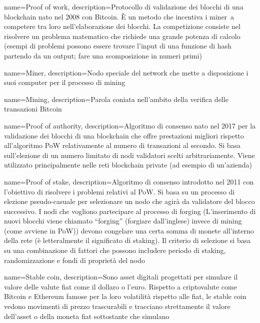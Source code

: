 {
	name={Proof of work},
	description={Protocollo di validazione dei blocchi di una blockchain nato nel 2008 con Bitcoin. È un metodo che incentiva i miner\glo\ a competere tra loro nell’elaborazione dei blocchi. La competizione consiste nel risolvere un problema matematico che richiede una grande potenza di calcolo (esempi di problemi possono essere trovare l’input di una funzione di hash partendo da un output; fare una scomposizione in numeri primi)}
}

{
	name={Miner},
	description={Nodo speciale del network che mette a disposizione i suoi computer per il processo di mining\glo}
}

{
	name={Mining},
	description={Parola coniata nell’ambito della verifica delle transazioni Bitcoin}
}

{
	name={Proof of authority},
	description={Algoritmo di consenso nato nel 2017 per la validazione dei blocchi di una blockchain che offre prestazioni migliori rispetto all’algoritmo PoW relativamente al numero di transazioni al secondo. Si basa sull’elezione di un numero limitato di nodi validatori scelti arbitrariamente. Viene utilizzato principalmente nelle reti blockchain private (ad esempio di un’azienda)}
}

{
	name={Proof of stake},
	description={Algoritmo di consenso introdotto nel 2011 con l’obiettivo di risolvere i problemi relativi al PoW. Si basa su un processo di elezione pseudo-casuale per selezionare un nodo che agirà da validatore del blocco successivo.  I nodi che vogliono partecipare al processo di forging (L’inserimento di nuovi blocchi viene chiamato “forging” (forgiare dall’inglese) invece di mining (come avviene in PoW)) devono congelare una certa somma di monete all’interno della rete (è letteralmente il significato di staking). Il criterio di selezione si basa su una combinazione di fattori che possono includere periodo di staking, randomizzazione e fondi di proprietà del nodo}
}

{
	name={Stable coin},
	description={Sono asset digitali progettati per simulare il valore delle valute fiat come il dollaro o l'euro. Rispetto a criptovalute come Bitcoin e Ethereum famose per la loro volatilità rispetto alle fiat, le stable coin vedono movimenti di prezzo trascurabili e tracciano strettamente il valore dell'asset o della moneta fiat sottostante che simulano}
}

